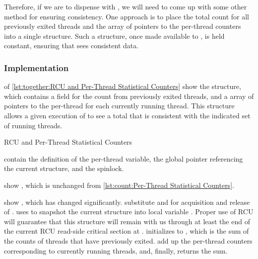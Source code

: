Therefore, if we are to dispense with , we will need
to come up with some other method for ensuring consistency.
One approach is to place the total count for all previously exited
threads and the array of pointers to the per-thread counters into a single
structure.
Such a structure, once made available to , is
held constant, ensuring that  sees consistent data.

\subsubsection{Implementation}

\begin{fcvref}
 of
\cref{lst:together:RCU and Per-Thread Statistical Counters}
show the  structure, which contains a
 field for the count from previously exited threads,
and a  array of pointers to the per-thread
 for each currently running thread.
This structure allows a given execution of 
to see a total that is consistent with the indicated set of running
threads.

\begin{listing}[bp]

\caption{RCU and Per-Thread Statistical Counters}
\label{lst:together:RCU and Per-Thread Statistical Counters}
\end{listing}

contain the definition of the per-thread 
variable, the global pointer  referencing
the current  structure, and
the  spinlock.

 show , which is unchanged from
\cref{lst:count:Per-Thread Statistical Counters}.
\end{fcvref}

\begin{fcvref}
 show , which has changed significantly.
 substitute  and
 for acquisition and release of .
 uses  to snapshot the
current  structure into local variable .
Proper use of RCU will guarantee that this  structure
will remain with us through at least the end of the current RCU
read-side critical section at .
 initializes  to , which is the
sum of the counts of threads that have previously exited.
 add up the per-thread counters corresponding
to currently
running threads, and, finally,  returns the sum.
\end{fcvref}

